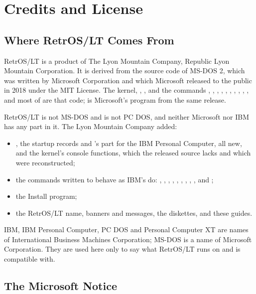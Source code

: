 \mwnewpart
\renewcommand\runningtitle{Appendix D. Credits and License}
\chapter{Credits and License}
\sectioncontents

\section{Where RetrOS/LT Comes From}

RetrOS/LT is a product of The Lyon Mountain Company, Republic Lyon
Mountain Corporation. It is derived from the source code of MS-DOS 2,
which was written by Microsoft Corporation and which Microsoft released to
the public in 2018 under the MIT License. The kernel, ,
, and the commands , ,
, , , , ,
, , ,  and most of
 are that code;  is Microsoft's program from the
same release.

RetrOS/LT is not MS-DOS and is not PC DOS, and neither Microsoft nor IBM
has any part in it. The Lyon Mountain Company added:

\begin{itemize}
\item {}, the startup records and 's part for
  the IBM Personal Computer, all new, and the kernel's console functions,
  which the released source lacks and which were reconstructed;
\item the commands written to behave as IBM's do: ,
  , , , ,
  , , , ,
   and ;
\item the Install program;
\item the RetrOS/LT name, banners and messages, the diskettes, and these
  guides.
\end{itemize}

IBM, IBM Personal Computer, PC DOS and Personal Computer XT are names of
International Business Machines Corporation; MS-DOS is a name of
Microsoft Corporation. They are used here only to say what RetrOS/LT runs
on and is compatible with.

\section{The Microsoft Notice}

